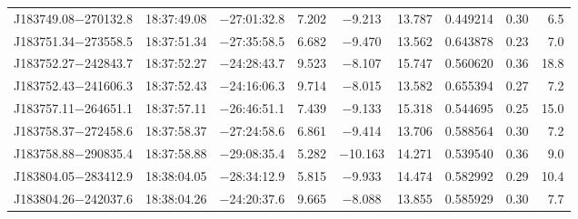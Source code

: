 \begin{table*}
\begin{tabular}{lcccccccr}
J183749.08$-$270132.8 & 18:37:49.08 & $-$27:01:32.8 &  7.202 & $-$9.213 & 13.787 & 0.449214 & 0.30 & 6.5 \\
J183751.34$-$273558.5 & 18:37:51.34 & $-$27:35:58.5 &  6.682 & $-$9.470 & 13.562 & 0.643878 & 0.23 & 7.0 \\
J183752.27$-$242843.7 & 18:37:52.27 & $-$24:28:43.7 &  9.523 & $-$8.107 & 15.747 & 0.560620 & 0.36 & 18.8 \\
J183752.43$-$241606.3 & 18:37:52.43 & $-$24:16:06.3 &  9.714 & $-$8.015 & 13.582 & 0.655394 & 0.27 & 7.2 \\
J183757.11$-$264651.1 & 18:37:57.11 & $-$26:46:51.1 &  7.439 & $-$9.133 & 15.318 & 0.544695 & 0.25 & 15.0 \\
J183758.37$-$272458.6 & 18:37:58.37 & $-$27:24:58.6 &  6.861 & $-$9.414 & 13.706 & 0.588564 & 0.30 & 7.2 \\
J183758.88$-$290835.4 & 18:37:58.88 & $-$29:08:35.4 &  5.282 & $-$10.163 & 14.271 & 0.539540 & 0.36 & 9.0 \\
J183804.05$-$283412.9 & 18:38:04.05 & $-$28:34:12.9 &  5.815 & $-$9.933 & 14.474 & 0.582992 & 0.29 & 10.4 \\
J183804.26$-$242037.6 & 18:38:04.26 & $-$24:20:37.6 &  9.665 & $-$8.088 & 13.855 & 0.585929 & 0.30 & 7.7 \\
\hline
\end{tabular}
\end{table*}

\addtocounter{table}{-1}

